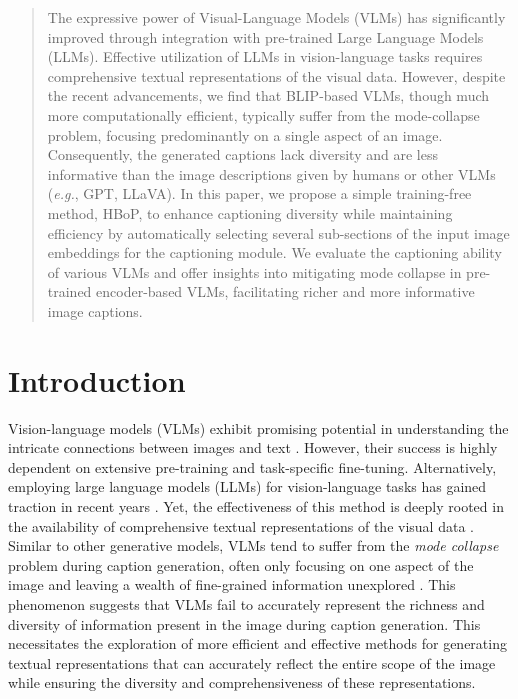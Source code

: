 \begin{abstract}
The expressive power of Visual-Language Models (VLMs) has significantly improved through integration with pre-trained Large Language Models (LLMs). Effective utilization of LLMs in vision-language tasks requires comprehensive textual representations of the visual data. However, despite the recent advancements, we find that BLIP-based VLMs, though much more computationally efficient, typically suffer from the mode-collapse problem, focusing predominantly on a single aspect of an image. Consequently, the generated captions lack diversity and are less informative than the image descriptions given by humans or other VLMs (\textit{e.g.}, GPT, LLaVA). In this paper, we propose a simple training-free method, HBoP, to enhance captioning diversity while maintaining efficiency by automatically selecting several sub-sections of the input image embeddings for the captioning module. We evaluate the captioning ability of various VLMs and offer insights into mitigating mode collapse in pre-trained encoder-based VLMs, facilitating richer and more informative image captions.
\end{abstract}

\section{Introduction}
Vision-language models (VLMs) exhibit promising potential in understanding the intricate connections between images and text \cite{alayrac2022flamingo,li2022blip,Align_before_Fuse,radford2021learning,wang2022ofa,wang2022image}. However, their success is highly dependent on extensive pre-training and task-specific fine-tuning. Alternatively, employing large language models (LLMs) for vision-language tasks has gained traction in recent years \cite{tiong2022plug,guo2023images,tang2023context,liu2023hidden}. Yet, the effectiveness of this method is deeply rooted in the availability of comprehensive textual representations of the visual data \cite{xu2021towards}. Similar to other generative models, VLMs tend to suffer from the \textit{mode collapse} \cite{chen2022learning} problem during caption generation, often only focusing on one aspect of the image and leaving a wealth of fine-grained information unexplored \cite{aneja2019sequential,chen2022learning,bianco2023improving}. This phenomenon suggests that VLMs fail to accurately represent the richness and diversity of information present in the image \cite{yuksekgonul2022and} during caption generation. This necessitates the exploration of more efficient and effective methods for generating textual representations that can accurately reflect the entire scope of the image while ensuring the diversity and comprehensiveness of these representations.


